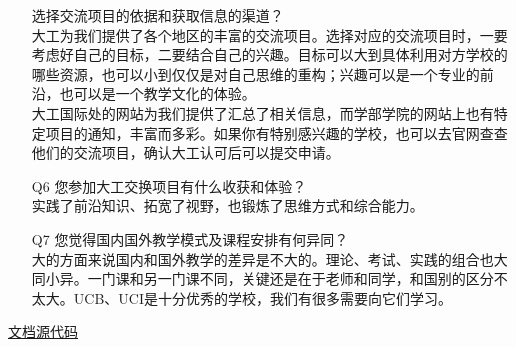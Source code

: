 \documentclass[10pt]{article}
\begin{document}
\begin{itemize}
{            {\large 选择交流项目的依据和获取信息的渠道？} \\
            大工为我们提供了各个地区的丰富的交流项目。选择对应的交流项目时，一要考虑好自己的目标，二要结合自己的兴趣。目标可以大到具体利用对方学校的哪些资源，也可以小到仅仅是对自己思维的重构；兴趣可以是一个专业的前沿，也可以是一个教学文化的体验。 \\
            大工国际处的网站为我们提供了汇总了相关信息，而学部学院的网站上也有特定项目的通知，丰富而多彩。如果你有特别感兴趣的学校，也可以去官网查查他们的交流项目，确认大工认可后可以提交申请。
            }
        \item [{\large Q6}]{
            {\large 您参加大工交换项目有什么收获和体验？} \\
            实践了前沿知识、拓宽了视野，也锻炼了思维方式和综合能力。
            }
        \item [{\large Q7}]{
            {\large 您觉得国内国外教学模式及课程安排有何异同？} \\
            大的方面来说国内和国外教学的差异是不大的。理论、考试、实践的组合也大同小异。一门课和另一门课不同，关键还是在于老师和同学，和国别的区分不太大。UCB、UCI是十分优秀的学校，我们有很多需要向它们学习。
            }
    \end{itemize}
    \centering
    {\small \href{https://github.com/Ls-Dai/Notes/blob/main/Meeting%20Nov%2015/questions.tex}{文档源代码}}
\end{document}
